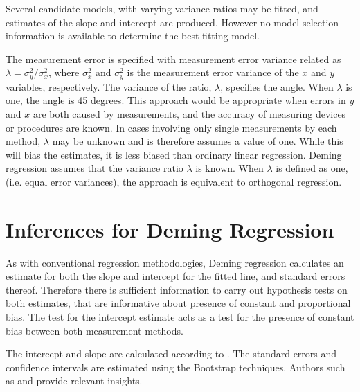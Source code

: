 \documentclass[12pt, a4paper]{report}
\theoremstyle{plain}
\theoremstyle{definition}
\theoremstyle{remark}
\begin{document}

Several candidate models, with varying variance ratios may be fitted, and estimates of the slope and intercept are produced. However no model selection information is available to determine the best fitting model.

The measurement error is specified with measurement error variance related as 
$\displaystyle{\lambda =\sigma^2_y/\sigma^2_x}$, where $\sigma^2_x$ and $\sigma^2_y$ is the measurement error variance of the $x$ and $y$ variables, respectively.
The variance of the ratio, $\lambda$, specifies the angle. When $\lambda$ is one, the angle is 45 degrees. 
This approach would be appropriate when errors in $y$ and $x$ are both caused by measurements, and the accuracy of measuring devices or procedures are known. In cases involving only single measurements by each method, $\lambda$ may be unknown and is therefore assumes a value of one. While this will bias the estimates, it is less biased than ordinary linear regression. Deming regression assumes that the variance ratio $\lambda$ is known. When $\lambda$ is defined as one, (i.e. equal error variances), the approach is equivalent to orthogonal regression.


\section{Inferences for Deming Regression}
As with conventional regression methodologies, Deming regression calculates an estimate for both the slope and intercept for the fitted line, and standard errors thereof. Therefore there is sufficient information to carry out hypothesis tests on both estimates, that are informative about presence of constant and proportional bias. The test for the intercept estimate acts as a test for the presence of constant bias between both measurement methods.

The intercept and slope are calculated according to \citet{CornCoch}. The standard errors and confidence intervals are estimated using the Bootstrap techniques. Authors such as \citet{carpenter2000bootstrap} and \citet{johnson2001bootstrap} provide relevant insights.
\end{document}
